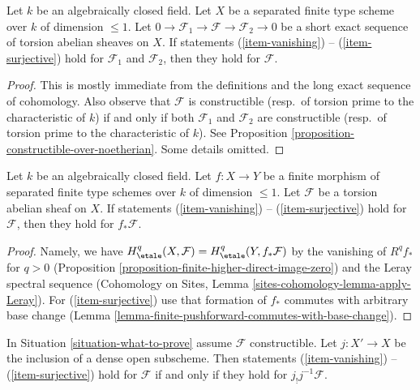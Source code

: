 \begin{lemma}
\label{lemma-ses-statements}
Let $k$ be an algebraically closed field. Let $X$ be a separated finite
type scheme over $k$ of dimension $\leq 1$. Let
$0 \to \mathcal{F}_1 \to \mathcal{F} \to \mathcal{F}_2 \to 0$
be a short exact sequence of torsion abelian sheaves on $X$.
If statements (\ref{item-vanishing}) -- (\ref{item-surjective}) hold
for $\mathcal{F}_1$ and $\mathcal{F}_2$, then they hold
for $\mathcal{F}$.
\end{lemma}

\begin{proof}
This is mostly immediate from the definitions and the long exact sequence
of cohomology. Also observe that $\mathcal{F}$ is constructible
(resp.\ of torsion prime to the characteristic of $k$) if and only if
both $\mathcal{F}_1$ and $\mathcal{F}_2$ are constructible
(resp.\ of torsion prime to the characteristic of $k$). See
Proposition \ref{proposition-constructible-over-noetherian}.
Some details omitted.
\end{proof}

\begin{lemma}
\label{lemma-finite-pushforward-statements}
Let $k$ be an algebraically closed field. Let $f : X \to Y$ be a
finite morphism of separated finite type schemes over $k$ of
dimension $\leq 1$. Let $\mathcal{F}$ be a torsion abelian sheaf on $X$.
If statements (\ref{item-vanishing}) -- (\ref{item-surjective}) hold
for $\mathcal{F}$, then they hold for $f_*\mathcal{F}$.
\end{lemma}

\begin{proof}
Namely, we have $H^q_\etale(X, \mathcal{F}) = H^q_\etale(Y, f_*\mathcal{F})$
by the vanishing of $R^qf_*$ for $q > 0$
(Proposition \ref{proposition-finite-higher-direct-image-zero}) and
the Leray spectral sequence
(Cohomology on Sites, Lemma \ref{sites-cohomology-lemma-apply-Leray}).
For (\ref{item-surjective}) use that formation of $f_*$ commutes with
arbitrary base change
(Lemma \ref{lemma-finite-pushforward-commutes-with-base-change}).
\end{proof}

\begin{lemma}
\label{lemma-restrict-to-open}
In Situation \ref{situation-what-to-prove} assume $\mathcal{F}$
constructible. Let $j : X' \to X$ be the inclusion of a dense open subscheme.
Then statements
(\ref{item-vanishing}) -- (\ref{item-surjective}) hold for $\mathcal{F}$
if and only if they hold for $j_!j^{-1}\mathcal{F}$.
\end{lemma}

